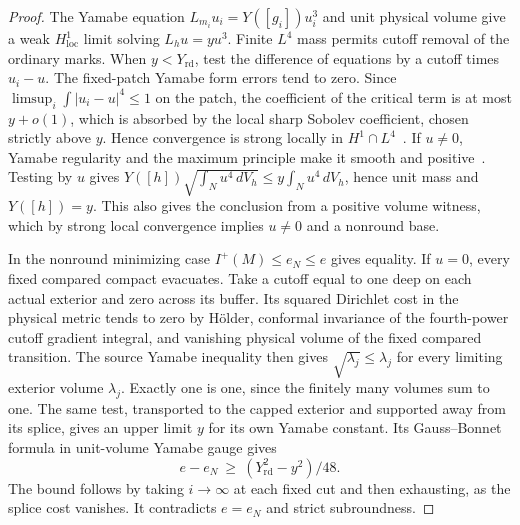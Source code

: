 \documentclass[11pt]{article}
\numberwithin{equation}{section}
\theoremstyle{definition}
\theoremstyle{remark}
\newcommand{\rd}{\mathrm{rd}}
\begin{document}
\begin{proof}
The Yamabe equation \(L_{m_i}u_i=Y([g_i])u_i^3\) and unit physical
volume give a weak \(H^1_{\mathrm{loc}}\) limit solving \(L_hu=yu^3\).
Finite \(L^4\) mass permits cutoff removal of the ordinary marks.
When \(y<Y_{\rd}\), test the difference of equations by a cutoff
times \(u_i-u\). The fixed-patch Yamabe form errors tend to zero.
Since \(\limsup_i\int|u_i-u|^4\le1\) on the patch, the
coefficient of the critical term is at most \(y+o(1)\), which
is absorbed by the local sharp Sobolev coefficient, chosen
strictly above \(y\). Hence convergence is strong locally in
\(H^1\cap L^4\)~\cite{Baker2026MarkedLimits}. If \(u\ne0\),
Yamabe regularity and the maximum principle make it smooth and
positive~\cite[\S2--3]{LeeParker1987Yamabe}. Testing by \(u\)
gives \(Y([h])\sqrt{\int_N u^4\,dV_h}\le
y\int_N u^4\,dV_h\), hence unit mass and \(Y([h])=y\).
This also gives the conclusion from a positive volume witness,
which by strong local convergence implies \(u\ne0\) and a
nonround base.

In the nonround minimizing case \(I^+(M)\le e_N\le e\) gives
equality. If \(u=0\), every fixed compared compact evacuates.
Take a cutoff equal to one deep on each actual exterior and zero
across its buffer. Its squared Dirichlet cost in the physical
metric tends to zero by H\"older, conformal invariance of the
fourth-power cutoff gradient integral, and vanishing physical
volume of the fixed compared transition. The source Yamabe
inequality then gives \(\sqrt{\lambda_j}\le\lambda_j\) for
every limiting exterior volume \(\lambda_j\). Exactly one is
one, since the finitely many volumes sum to one. The same test,
transported to the capped exterior and supported away from its
splice, gives an upper limit \(y\) for its own Yamabe constant.
Its Gauss--Bonnet formula in unit-volume Yamabe gauge gives
\[
 e-e_N\ \ge\ (Y_{\rd}^2-y^2)/48 .
\]
The bound follows by taking \(i\to\infty\) at each fixed cut and
then exhausting, as the splice cost vanishes. It contradicts
\(e=e_N\) and strict subroundness.


\end{proof}
\end{document}
